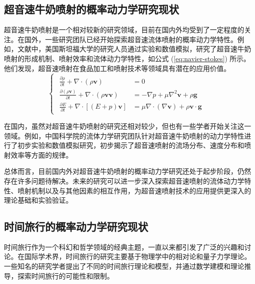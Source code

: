 \subsection{超音速牛奶喷射的概率动力学研究现状}
超音速牛奶喷射是一个相对较新的研究领域，目前在国内外均受到了一定程度的关注。在国外，一些研究团队已经开始探索超音速流体喷射的概率动力学特性。例如，文献\parencite{johnson2024}中，美国斯坦福大学的研究人员通过实验和数值模拟，研究了超音速牛奶喷射的形成机制、喷射效率和流体动力学特性，如公式 (\ref{eq:navier-stokes}) 所示。他们发现，超音速喷射在食品加工和喷射技术等领域具有潜在的应用价值。
\begin{equation}
  \begin{cases}
    \begin{aligned}
      \frac{\partial \rho}{\partial t} + \nabla \cdot (\rho \mathbf{v})                         & = 0                                                                                  \\
      \frac{\partial (\rho \mathbf{v})}{\partial t} + \nabla \cdot (\rho \mathbf{v} \mathbf{v}) & = -\nabla p + \mu \nabla^2 \mathbf{v} + \rho \mathbf{g}                              \\
      \frac{\partial E}{\partial t} + \nabla \cdot \left[(E + p) \mathbf{v}\right]              & = \mu \nabla \cdot \left(\nabla \mathbf{v}\right) + \rho \mathbf{v} \cdot \mathbf{g}
    \end{aligned}
  \end{cases}
  \label{eq:navier-stokes}
\end{equation}

在国内，虽然对超音速牛奶喷射的研究还相对较少，但也有一些学者开始关注这一领域。例如，中国科学院的流体力学研究团队针对超音速牛奶喷射的动力学特性进行了初步实验和数值模拟研究，初步揭示了超音速喷射的流场分布、速度分布和喷射效率等方面的规律。

总体而言，目前国内外对超音速牛奶喷射的概率动力学研究还处于起步阶段，仍然存在许多问题待解决。未来的研究可以进一步深入探索超音速喷射的流体动力学特性、喷射机制以及与其他因素的相互作用，为超音速喷射技术的应用提供更深入的理论基础和实验验证。

\subsection{时间旅行的概率动力学研究现状}
时间旅行作为一个科幻和哲学领域的经典主题，一直以来都引发了广泛的兴趣和讨论。在国际学术界，时间旅行的研究主要基于物理学中的相对论和量子力学理论。一些知名的研究学者提出了不同的时间旅行理论和模型，并通过数学建模和理论推导，探索时间旅行的可能性和限制。

